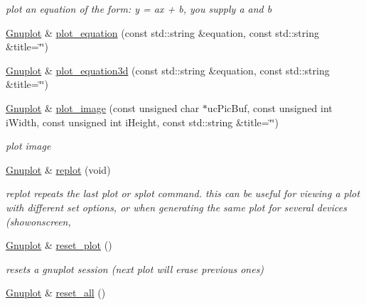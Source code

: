 \begin{DoxyCompactItemize}
\begin{DoxyCompactList}\small\item\em plot an equation of the form\-: y = ax + b, you supply a and b \end{DoxyCompactList}\item 
\hyperlink{class_gnuplot}{Gnuplot} \& \hyperlink{class_gnuplot_a42dfb8c9d4636745c7be277ed818e849}{plot\-\_\-equation} (const std\-::string \&equation, const std\-::string \&title=\char`\"{}\char`\"{})
\item 
\hyperlink{class_gnuplot}{Gnuplot} \& \hyperlink{class_gnuplot_a79aed3a6927f7d1d3497cba441e8a943}{plot\-\_\-equation3d} (const std\-::string \&equation, const std\-::string \&title=\char`\"{}\char`\"{})
\item 
\hyperlink{class_gnuplot}{Gnuplot} \& \hyperlink{class_gnuplot_aae22c0470a6fbbc1f5e84dec8d023381}{plot\-\_\-image} (const unsigned char $\ast$uc\-Pic\-Buf, const unsigned int i\-Width, const unsigned int i\-Height, const std\-::string \&title=\char`\"{}\char`\"{})
\begin{DoxyCompactList}\small\item\em plot image \end{DoxyCompactList}\item 
\hyperlink{class_gnuplot}{Gnuplot} \& \hyperlink{class_gnuplot_a34c1b3e877d246a841a29f857a29f502}{replot} (void)
\begin{DoxyCompactList}\small\item\em replot repeats the last plot or splot command. this can be useful for viewing a plot with different set options, or when generating the same plot for several devices (showonscreen, \end{DoxyCompactList}\item 
\hypertarget{class_gnuplot_a6797761712d3c311e3685bcccba65dd4}{\hyperlink{class_gnuplot}{Gnuplot} \& \hyperlink{class_gnuplot_a6797761712d3c311e3685bcccba65dd4}{reset\-\_\-plot} ()}\label{class_gnuplot_a6797761712d3c311e3685bcccba65dd4}

\begin{DoxyCompactList}\small\item\em resets a gnuplot session (next plot will erase previous ones) \end{DoxyCompactList}\item 
\hypertarget{class_gnuplot_a9aedfe8371083a1a3ac2b9493810049c}{\hyperlink{class_gnuplot}{Gnuplot} \& \hyperlink{class_gnuplot_a9aedfe8371083a1a3ac2b9493810049c}{reset\-\_\-all} ()}\label{class_gnuplot_a9aedfe8371083a1a3ac2b9493810049c}


\end{DoxyCompactItemize}

